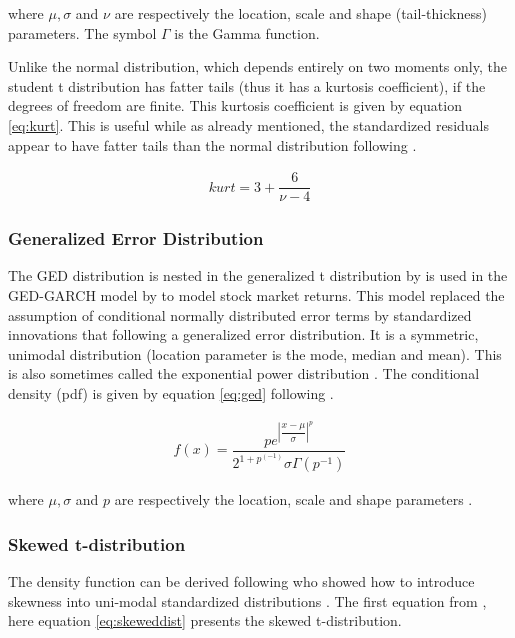 \documentclass[a4paper, twoside]{templates/ociamthesis}
\begin{document}
\noindent where \(\mu, \sigma\) and \(\nu\) are respectively the location, scale and shape (tail-thickness) parameters. The symbol \(\Gamma\) is the Gamma function.

\noindent Unlike the normal distribution, which depends entirely on two moments only, the student t distribution has fatter tails (thus it has a kurtosis coefficient), if the degrees of freedom are finite. This kurtosis coefficient is given by equation \eqref{eq:kurt}. This is useful while as already mentioned, the standardized residuals appear to have fatter tails than the normal distribution following \textcite{bollerslev2008}.

\begin{align}
kurt = 3 + \dfrac{6}{\nu-4}
 \label{eq:kurt}
\end{align}

\hypertarget{generalized-error-distribution}{%
\subsubsection{Generalized Error Distribution}\label{generalized-error-distribution}}

\noindent The GED distribution is nested in the generalized t distribution by \textcite{mcdonald1988} is used in the GED-GARCH model by \textcite{nelson1991} to model stock market returns. This model replaced the assumption of conditional normally distributed error terms by standardized innovations that following a generalized error distribution. It is a symmetric, unimodal distribution (location parameter is the mode, median and mean). This is also sometimes called the exponential power distribution \autocite{bollerslev2008}. The conditional density (pdf) is given by equation \eqref{eq:ged} following \textcite{ghalanos2020}.

\begin{align}
f(x) = \dfrac{p e^{\left|\dfrac{x-\mu}{\sigma}\right|^p}}{2^{1+p^(-1)}\sigma\Gamma(p^{-1})}
 \label{eq:ged}
\end{align}

where \(\mu, \sigma\) and \(p\) are respectively the location, scale and shape parameters .

\hypertarget{skewed-t-distribution}{%
\subsubsection{Skewed t-distribution}\label{skewed-t-distribution}}

\noindent The density function can be derived following \textcite{fernández1998} who showed how to introduce skewness into uni-modal standardized distributions \autocite{trottier2015}. The first equation from \textcite{trottier2015}, here equation \eqref{eq:skeweddist} presents the skewed t-distribution.
\end{document}
